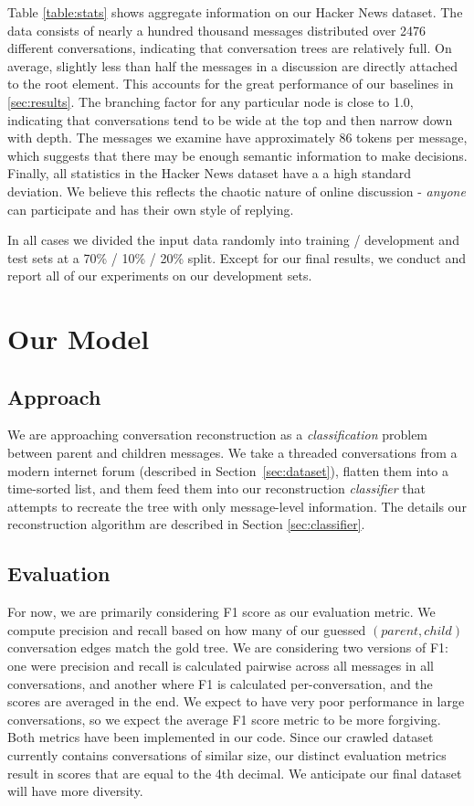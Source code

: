 \documentclass[10pt]{article}
\begin{document}
Table \ref{table:stats} shows aggregate information on our Hacker News
dataset. The data consists of nearly a hundred thousand messages distributed
over 2476 different conversations, indicating that conversation trees 
are relatively full. On average, slightly less than half the messages
in a discussion are directly attached to the root element. This accounts
for the great performance of our baselines in \ref{sec:results}. 
The branching factor for any particular node is close to 1.0, indicating
that conversations tend to be wide at the top and then narrow down with
depth. The messages we examine have approximately 86 tokens per message,
which suggests that there may be enough semantic information to make
decisions. Finally, all statistics in the Hacker News dataset have a
a high standard deviation. We believe this reflects the chaotic nature of
online discussion - \textit{anyone} can participate and has their own
style of replying.

In all cases we divided the input data randomly into training / development
and test sets at a 70\% / 10\% / 20\% split. Except for our final results, we
conduct and report all of our experiments on our development sets.

\section{Our Model}
\subsection{Approach}
\label{sec:approach}
We are approaching conversation reconstruction as a \textit{classification} problem
between parent and children messages. We take a threaded conversations from a modern internet forum 
(described in Section~\ref{sec:dataset}), flatten them into a time-sorted list, and them feed
them into our reconstruction \textit{classifier} that attempts to recreate the tree
with only message-level information. The details our reconstruction algorithm are 
described in Section \ref{sec:classifier}.

\subsection{Evaluation}
\label{sec:evaluation}
For now, we are primarily considering F1 score as our evaluation metric. We
compute precision and recall based on how many of our guessed 
$(parent,child)$ conversation edges match the gold tree. We are considering 
two versions of F1: one were precision and recall is calculated pairwise 
across all messages in all conversations, and another where F1 is calculated 
per-conversation, and the scores are averaged in the end. We expect to have 
very poor performance  in large conversations, so we expect the average F1
score metric to be more forgiving. Both metrics have been implemented in our 
code. Since our crawled dataset currently contains conversations of similar 
size, our distinct evaluation metrics result in scores that are equal to the 
4th decimal. We anticipate our final dataset will have more diversity.
\end{document}
